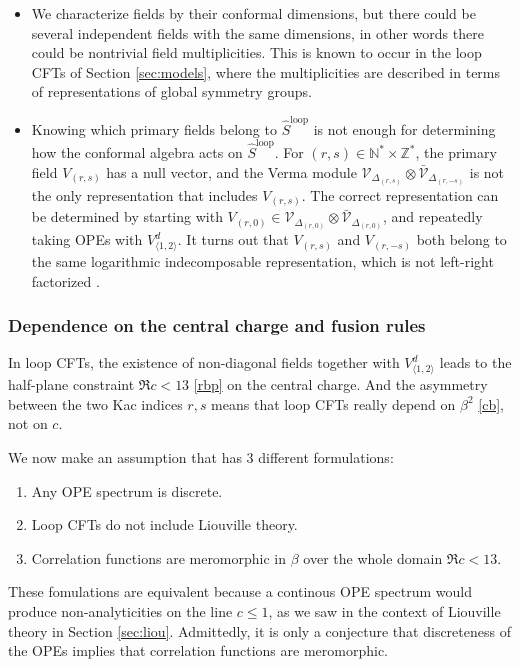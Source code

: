 \documentclass[12pt, a4paper]{article}
\theoremstyle{break}
\begin{document}
\begin{itemize}
 \item We characterize fields by their conformal dimensions, but there could be several independent fields with the same dimensions, in other words there could be nontrivial field multiplicities. This is known to occur in the loop CFTs of Section \ref{sec:models}, where the multiplicities are described in terms of representations of global symmetry groups.  
 \item Knowing which primary fields belong to $\widehat{S}^\text{loop}$ is not enough for determining how the conformal algebra acts on $\widehat{S}^\text{loop}$. For $(r,s)\in \mathbb{N}^*\times \mathbb{Z}^*$, the primary field $V_{(r,s)}$ has a null vector, and the Verma module $\mathcal{V}_{\Delta_{(r,s)}}\otimes\bar{\mathcal{V}}_{\Delta_{(r,-s)}}$ is not the only representation that includes $V_{(r,s)}$. The correct representation can be determined by starting with $V_{(r,0)}\in \mathcal{V}_{\Delta_{(r,0)}}\otimes\bar{\mathcal{V}}_{\Delta_{(r,0)}}$, and repeatedly taking OPEs with $V^d_{\langle 1,2\rangle}$. It turns out that $V_{(r,s)}$ and $V_{(r,-s)}$ both belong to the same logarithmic indecomposable representation, which is not left-right factorized  \cite{nr20}. 
\end{itemize}

\subsubsection{Dependence on the central charge and fusion rules}

In loop CFTs, the existence of non-diagonal fields together with $V^d_{\langle 1,2\rangle}$ leads to the half-plane constraint $\Re c<13$ \eqref{rbp} on the central charge. And the asymmetry between the two Kac indices $r,s$ means that loop CFTs really depend on $\beta^2$ \eqref{cb}, not on $c$. 

We now make an assumption that has 3 different formulations:
\begin{enumerate}
 \item Any OPE spectrum is discrete.
 \item Loop CFTs do not include Liouville theory. 
 \item Correlation functions are meromorphic in $\beta$ over the whole domain $\Re c<13$.
\end{enumerate}
These fomulations are equivalent because a continous OPE spectrum would produce non-analyticities on the line $c\leq 1$, as we saw in the context of Liouville theory in Section \ref{sec:liou}. Admittedly, it is only a conjecture that discreteness of the OPEs implies that correlation functions are meromorphic.
\end{document}
